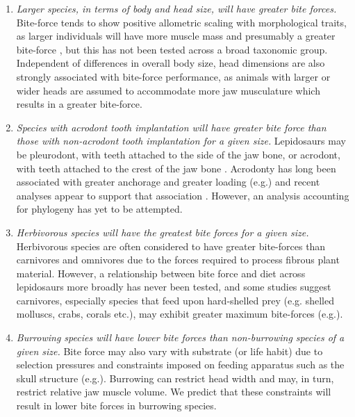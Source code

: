 \documentclass[a4paper, 12pt]{article}
\begin{document}
\begin{enumerate}

\item \textit{Larger species, in terms of body and head size, will have greater bite forces.} 
Bite-force tends to show positive allometric scaling with morphological traits, as larger individuals will have more muscle mass and presumably a greater bite-force \cite{aguirre2002ecomorphological,herrel2004omnivory,lailvaux2004performance,vanhooydonck2005does,MEASEY2009217}, but this has not been tested across a broad taxonomic group. 
Independent of differences in overall body size, head dimensions are also strongly associated with bite-force performance\cite{kaliontzopoulou2012relationships,jones2020reproductive}, as animals with larger or wider heads are assumed to accommodate more jaw musculature which results in a greater bite-force\cite{herrel1999morphology,huyghe2005morphology}.

\item \textit{Species with acrodont tooth implantation will have greater bite force than those with non-acrodont tooth implantation for a given size.} 
Lepidosaurs may be pleurodont, with teeth attached to the side of the jaw bone, or acrodont, with teeth attached to the crest of the jaw bone \cite{smith1958evolutionary}.
Acrodonty has long been associated with greater anchorage and greater loading (e.g.\cite{smith1958evolutionary,jones2008skull}) and recent analyses appear to support that association \cite{jenkins2020bite}.
However, an analysis accounting for phylogeny has yet to be attempted.

\item \textit{Herbivorous species will have the greatest bite forces for a given size.}
Herbivorous species are often considered to have greater bite-forces than carnivores and omnivores due to the forces required to process fibrous plant material\cite{cooper2002distribution,herrel1999morphology,metzger2005correlations,herrel2004omnivory,Herrel2008}.
However, a relationship between bite force and diet across lepidosaurs more broadly has never been tested, and some studies suggest carnivores, especially species that feed upon hard-shelled prey (e.g. shelled molluscs, crabs, corals etc.), may exhibit greater maximum bite-forces (e.g.\cite{schaerlaeken2012built}).

\item \textit{Burrowing species will have lower bite forces than non-burrowing species of a given size.}
Bite force may also vary with substrate (or life habit) due to selection pressures and constraints imposed on feeding apparatus such as the skull structure (e.g.\cite{gray2019evolution}).
Burrowing can restrict head width\cite{vanhooydonck2011push} and may, in turn, restrict relative jaw muscle volume. We predict that these constraints will result in lower bite forces in burrowing species. 

\end{enumerate}
\end{document}
